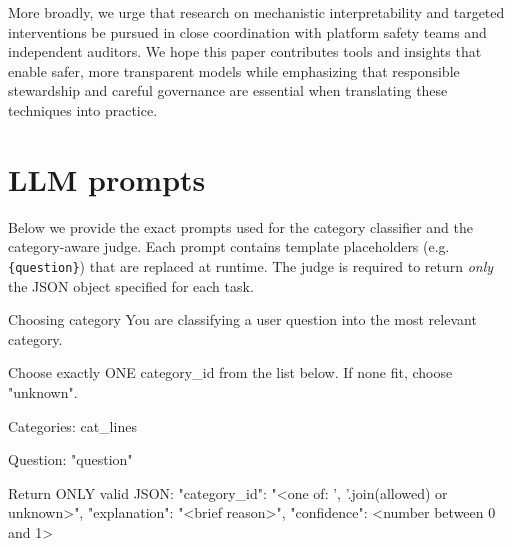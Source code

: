\documentclass{article}
\theoremstyle{plain}
\theoremstyle{definition}
\theoremstyle{remark}
\begin{document}
More broadly, we urge that research on mechanistic interpretability and targeted interventions be pursued in close coordination with platform safety teams and independent auditors. We hope this paper contributes tools and insights that enable safer, more transparent models while emphasizing that responsible stewardship and careful governance are essential when translating these techniques into practice.








\newpage
\appendix
\onecolumn

\section{LLM prompts}
\label{sec:llm_prompts}

Below we provide the exact prompts used for the category classifier and the category-aware judge. Each prompt contains template placeholders (e.g. \texttt{\{question\}}) that are replaced at runtime. The judge is required to return \emph{only} the JSON object specified for each task.

\begin{promptbox}{Choosing category}
You are classifying a user question into the most relevant category.

Choose exactly ONE category_id from the list below.
If none fit, choose "unknown".

Categories:
{cat_lines}

Question: "{question}"

Return ONLY valid JSON:
{
  "category_id": "<one of: {', '.join(allowed)} or unknown>",
  "explanation": "<brief reason>",
  "confidence": <number between 0 and 1>
}
\end{promptbox}
\end{document}
